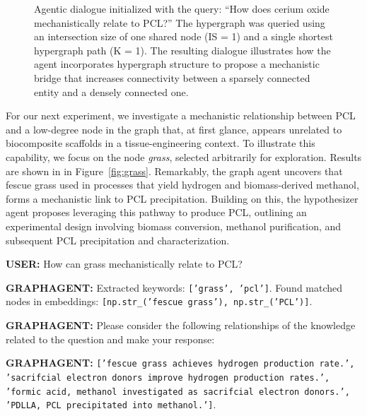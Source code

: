 \documentclass{article}
\begin{document}
\begin{figure}[htbp]
\centering
\small
\caption{Agentic dialogue initialized with the query: “How does cerium oxide mechanistically relate to PCL?” The hypergraph was queried using an intersection size of one shared node (IS = 1) and a single shortest hypergraph path (K = 1). The resulting dialogue illustrates how the agent incorporates hypergraph structure to propose a mechanistic bridge that increases connectivity between a sparsely connected entity and a densely connected one.}
\label{fig:cerium}
\end{figure}

For our next experiment, we investigate a mechanistic relationship between PCL and a low-degree node in the graph that, at first glance, appears unrelated to biocomposite scaffolds in a tissue-engineering context. To illustrate this capability, we focus on the node \textit{grass}, selected arbitrarily for exploration. Results are shown in in Figure~\ref{fig:grass}. Remarkably, the graph agent uncovers that fescue grass used in processes that yield hydrogen and biomass-derived methanol, forms a mechanistic link to PCL precipitation. Building on this, the hypothesizer agent proposes leveraging this pathway to produce PCL, outlining an experimental design involving biomass conversion, methanol purification, and subsequent PCL precipitation and characterization. 


\begin{rightbubbles}
\textbf{USER:} How can grass mechanistically relate to PCL? 
\end{rightbubbles}

\begin{leftbubbles}
\textbf{GRAPHAGENT:} Extracted keywords: \texttt{['grass', 'pcl']}. 
Found matched nodes in embeddings: \texttt{[np.str\_('fescue grass'), np.str\_('PCL')]}.

\textbf{GRAPHAGENT:} Please consider the following relationships of the knowledge related to the question and make your response: 

\textbf{GRAPHAGENT:} \texttt{['fescue grass achieves hydrogen production rate.', 'sacrifcial electron donors improve hydrogen production rates.', 'formic acid, methanol investigated as sacrifcial electron donors.', 'PDLLA, PCL precipitated into methanol.']}.
\end{leftbubbles}
\end{document}
